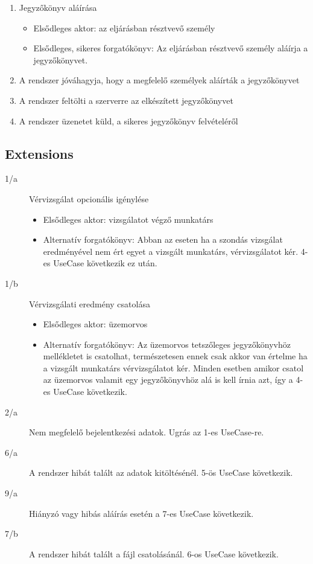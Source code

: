 \begin{enumerate}
	\item Jegyzőkönyv aláírása
	\begin{itemize}
		\item Elsődleges aktor: az eljárásban résztvevő személy 
		\item Elsődleges, sikeres forgatókönyv: Az eljárásban résztvevő személy aláírja a jegyzőkönyvet.
	\end{itemize}
	\item A rendszer jóváhagyja, hogy a megfelelő személyek aláírták a jegyzőkönyvet
	\item A rendszer feltölti a szerverre az elkészített jegyzőkönyvet
	\item A rendszer üzenetet küld, a sikeres jegyzőkönyv felvételéről
\end{enumerate}

\subsection{Extensions}
\begin{description}
	\item [1/a] Vérvizsgálat opcionális igénylése
		\begin{itemize}
			\item Elsődleges aktor: vizsgálatot végző munkatárs
			\item Alternatív forgatókönyv: Abban az eseten ha a szondás vizsgálat eredményével nem ért egyet a vizsgált munkatárs, vérvizsgálatot kér. 4-es UseCase következik ez után.
		\end{itemize}
	\item [1/b] Vérvizsgálati eredmény csatolása
		\begin{itemize}
			\item Elsődleges aktor: üzemorvos
			\item Alternatív forgatókönyv:  Az üzemorvos tetszőleges jegyzőkönyvhöz mellékletet is csatolhat, természetesen ennek csak akkor van értelme ha a vizsgált munkatárs vérvizsgálatot kér. Minden esetben amikor csatol az üzemorvos valamit egy jegyzőkönyvhöz alá is kell írnia azt, így a 4-es UseCase következik.
		\end{itemize}
	\item [2/a] Nem megfelelő bejelentkezési adatok. Ugrás az 1-es UseCase-re.
	\item [6/a] A rendszer hibát talált az adatok kitöltésénél. 5-ös UseCase következik.
	\item [9/a] Hiányzó vagy hibás aláírás esetén a 7-es UseCase következik.
	\item [7/b] A rendszer hibát talált a fájl csatolásánál. 6-os UseCase következik.
\end{description}

